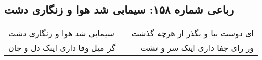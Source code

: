 \begin{center}
\section*{رباعی شماره ۱۵۸: سیمابی شد هوا و زنگاری دشت}
\label{sec:sh158}
\begin{longtable}{l p{0.5cm} r}
سیمابی شد هوا و زنگاری دشت
&&
ای دوست بیا و بگذر از هرچه گذشت
\\
گر میل وفا داری اینک دل و جان
&&
ور رای جفا داری اینک سر و تشت
\\
\end{longtable}
\end{center}
